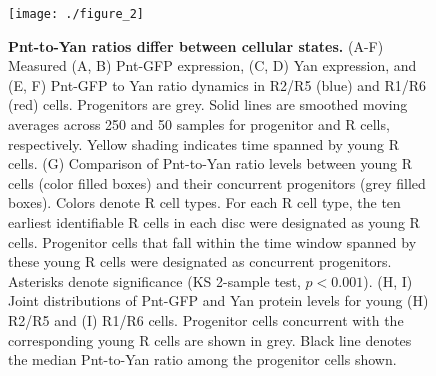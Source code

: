 \begin{figure}[h]
\centering
\texttt{[image: ./figure\_2]}
\caption[Pnt-to-Yan ratios differ between cellular states.]{\textbf{Pnt-to-Yan ratios differ between cellular states.} (A-F) Measured (A, B) Pnt-GFP expression, (C, D) Yan expression, and (E, F) Pnt-GFP to Yan ratio dynamics in R2/R5 (blue) and R1/R6 (red) cells. Progenitors are grey. Solid lines are smoothed moving averages across 250 and 50 samples for progenitor and R cells, respectively. Yellow shading indicates time spanned by young R cells. (G) Comparison of Pnt-to-Yan ratio levels between young R cells (color filled boxes) and their concurrent progenitors (grey filled boxes). Colors denote R cell types. For each R cell type, the ten earliest identifiable R cells in each disc were designated as young R cells. Progenitor cells that fall within the time window spanned by these young R cells were designated as concurrent progenitors. Asterisks denote significance (KS 2-sample test, $p<0.001$). (H, I) Joint distributions of Pnt-GFP and Yan protein levels for young (H) R2/R5 and (I) R1/R6 cells. Progenitor cells concurrent with the corresponding young R cells are shown in grey. Black line denotes the median Pnt-to-Yan ratio among the progenitor cells shown.}
\label{fig:ch2:fig2}
\end{figure}

